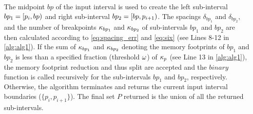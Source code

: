The midpoint $bp$ of the input interval is used to create the left sub-interval $bp_1=[p_{i},bp)$ and right sub-interval $bp_2=[bp,p_{i+1})$. 
The spacings $\delta_{bp_1}$ and $\delta_{bp_2}$, and the number of breakpoints $\kappa_{bp_1}$ and $\kappa_{bp_2}$ of sub-intervals $bp_1$ and $bp_2$ are then calculated according to \cref{eq:spacing_err} and \cref{eq:six} (see Lines 8-12 in \cref{alg:alg1}). 
If the sum of $\kappa_{bp_1}$ and $\kappa_{bp_2}$ denoting the memory footprints of $bp_1$ and $bp_2$ is less than a specified fraction (threshold $\omega$) of $\kappa_{p}$ (see Line 13 in \cref{alg:alg1}), the memory footprint reduction and thus split are accepted and the $binary$ function is called recursively for the sub-intervals $bp_1$ and $bp_2$, respectively.
Otherwise, the algorithm terminates and returns the current input interval boundaries ($\{p_i, p_{i+1}\}$).
The final set $P$ returned is the union of all the returned sub-intervals. 
